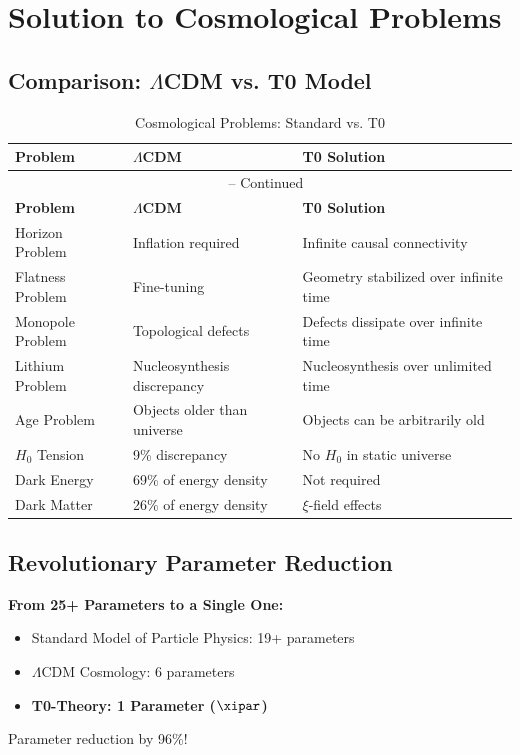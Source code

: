 	\section{Solution to Cosmological Problems}
	
	\subsection{Comparison: $\Lambda$CDM vs. T0 Model}
	
	\begin{longtable}{p{3.2cm}p{3.6cm}p{3.6cm}}
		\caption{Cosmological Problems: Standard vs. T0} \\
		\toprule
		\textbf{Problem} & \textbf{$\Lambda$CDM} & \textbf{T0 Solution} \\
		\midrule
		\endfirsthead
		\multicolumn{3}{c}{\tablename\ \thetable{} -- Continued} \\
		\toprule
		\textbf{Problem} & \textbf{$\Lambda$CDM} & \textbf{T0 Solution} \\
		\midrule
		\endhead
		Horizon Problem & Inflation required & Infinite causal connectivity \\
		Flatness Problem & Fine-tuning & Geometry stabilized over infinite time \\
		Monopole Problem & Topological defects & Defects dissipate over infinite time \\
		Lithium Problem & Nucleosynthesis discrepancy & Nucleosynthesis over unlimited time \\
		Age Problem & Objects older than universe & Objects can be arbitrarily old \\
		$H_0$ Tension & 9\% discrepancy & No $H_0$ in static universe \\
		Dark Energy & 69\% of energy density & Not required \\
		Dark Matter & 26\% of energy density & $\xi$-field effects \\
		\bottomrule
	\end{longtable}
\normalsize
	
	\subsection{Revolutionary Parameter Reduction}
	
	\begin{revolutionary}
		\textbf{From 25+ Parameters to a Single One:}
		
		\begin{itemize}
			\item Standard Model of Particle Physics: 19+ parameters
			\item $\Lambda$CDM Cosmology: 6 parameters
			\item \textbf{T0-Theory: 1 Parameter ($\xipar$)}
		\end{itemize}
		
		Parameter reduction by 96\%!
	\end{revolutionary}
	
